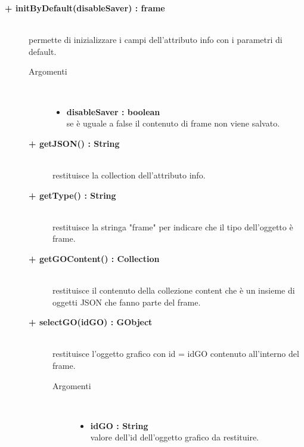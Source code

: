 \begin{description}
\begin{description}
		\item[\textbf{\color{blue}+ initByDefault(disableSaver) : frame			}] \hfill \\
			permette di inizializzare i campi dell'attributo info con i parametri di default. 

\begin{description}
			\item[Argomenti] \hfill \\
				\begin{itemize}
						\item \textbf{disableSaver : boolean			} \hfill \\
					se è uguale a false il contenuto di frame non viene salvato. %
				\end{itemize}

\end{description}

\begin{description}
		\item[\textbf{\color{blue}+ getJSON() : String			}] \hfill \\
			restituisce la collection dell'attributo info.

\end{description}

\begin{description}
		\item[\textbf{\color{blue}+ getType() : String			}] \hfill \\
			restituisce la stringa "frame" per indicare che il tipo dell'oggetto è frame.
\end{description}

\begin{description}
		\item[\textbf{\color{blue}+ getGOContent() : Collection			}] \hfill \\
			restituisce il contenuto della collezione content che è un insieme di oggetti JSON che fanno parte del frame.
\end{description}

\begin{description}
		\item[\textbf{\color{blue}+ selectGO(idGO) : GObject			}] \hfill \\
			restituisce l'oggetto grafico con id = idGO contenuto all'interno del frame. 

\begin{description}
			\item[Argomenti] \hfill \\
				\begin{itemize}
						\item \textbf{idGO : String			} \hfill \\
					valore dell'id dell'oggetto grafico da restituire.  				
				\end{itemize}


\end{description}
\end{description}
\end{description}
\end{description}
